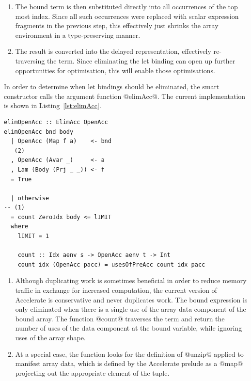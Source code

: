 \begin{enumerate}
\item The bound term is then substituted directly into all occurrences of the
    top most index. Since all such occurrences were replaced with scalar
    expression fragments in the previous step, this effectively just shrinks the
    array environment in a type-preserving manner.

\item The result is converted into the delayed representation, effectively
    re-traversing the term. Since eliminating the let binding can open up
    further opportunities for optimisation, this will enable those
    optimisations.


\end{enumerate}

In order to determine when let bindings should be eliminated, the smart
constructor calls the argument function @elimAcc@. The current implementation is
shown in Listing~\ref{lst:elimAcc}.

\begin{lstlisting}[style=haskell_float
    ,label=lst:elimAcc
    ,caption={Determining when a let binding should be eliminated}]
elimOpenAcc :: ElimAcc OpenAcc
elimOpenAcc bnd body
  | OpenAcc (Map f a)    <- bnd                                                        -- (2)
  , OpenAcc (Avar _)     <- a
  , Lam (Body (Prj _ _)) <- f
  = True

  | otherwise                                                                          -- (1)
  = count ZeroIdx body <= lIMIT
  where
    lIMIT = 1

    count :: Idx aenv s -> OpenAcc aenv t -> Int
    count idx (OpenAcc pacc) = usesOfPreAcc count idx pacc
\end{lstlisting}

\begin{enumerate}
\item Although duplicating work is sometimes beneficial in order to reduce
    memory traffic in exchange for increased computation, the current version of
    Accelerate is conservative and never duplicates work. The bound expression
    is only eliminated when there is a single use of the array data component of
    the bound array. The function @count@ traverses the term and return the
    number of uses of the data component at the bound variable, while ignoring
    uses of the array shape.

\item At a special case, the function looks for the definition of @unzip@
    applied to manifest array data, which is defined by the Accelerate prelude
    as a @map@ projecting out the appropriate element of the tuple.

\end{enumerate}

